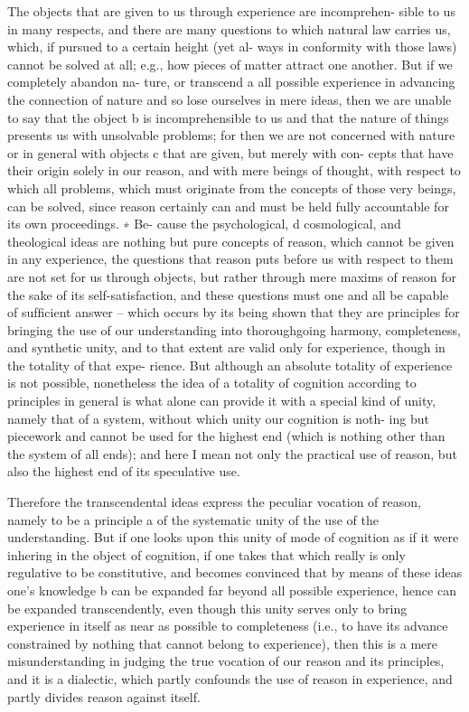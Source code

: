 The objects that are given to us through experience are incomprehen-
sible to us in many respects, and there are many questions to which
natural law carries us, which, if pursued to a certain height (yet al-
ways in conformity with those laws) cannot be solved at all; e.g., how
pieces of matter attract one another. But if we completely abandon na-
ture, or transcend a all possible experience in advancing the connection
of nature and so lose ourselves in mere ideas, then we are unable to say
that the object b is incomprehensible to us and that the nature of things
presents us with unsolvable problems; for then we are not concerned with
nature or in general with objects c that are given, but merely with con-
cepts that have their origin solely in our reason, and with mere beings of
thought, with respect to which all problems, which must originate from
the concepts of those very beings, can be solved, since reason certainly
can and must be held fully accountable for its own proceedings. ∗ Be-
cause the psychological, d cosmological, and theological ideas are nothing
but pure concepts of reason, which cannot be given in any experience,
the questions that reason puts before us with respect to them are not
set for us through objects, but rather through mere maxims of reason
for the sake of its self-satisfaction, and these questions must one and
all be capable of sufﬁcient answer – which occurs by its being shown
that they are principles for bringing the use of our understanding into
thoroughgoing harmony, completeness, and synthetic unity, and to that
extent are valid only for experience, though in the totality of that expe-
rience. But although an absolute totality of experience is not possible,
nonetheless the idea of a totality of cognition according to principles
in general is what alone can provide it with a special kind of unity,
namely that of a system, without which unity our cognition is noth-
ing but piecework and cannot be used for the highest end (which is
nothing other than the system of all ends); and here I mean not only
the practical use of reason, but also the highest end of its speculative
use.

Therefore the transcendental ideas express the peculiar vocation of
reason, namely to be a principle a of the systematic unity of the use of
the understanding. But if one looks upon this unity of mode of cognition
as if it were inhering in the object of cognition, if one takes that which
really is only regulative to be constitutive, and becomes convinced that by
means of these ideas one’s knowledge b can be expanded far beyond all
possible experience, hence can be expanded transcendently, even though
this unity serves only to bring experience in itself as near as possible to
completeness (i.e., to have its advance constrained by nothing that cannot
belong to experience), then this is a mere misunderstanding in judging
the true vocation of our reason and its principles, and it is a dialectic,
which partly confounds the use of reason in experience, and partly divides
reason against itself.

